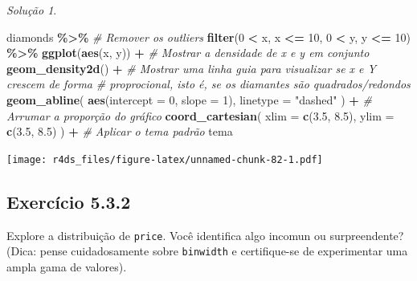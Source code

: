 \documentclass[
]{latex/krantz}
\newenvironment{Shaded}{\begin{snugshade}}{\end{snugshade}}
\newcommand{\AttributeTok}[1]{\textcolor[rgb]{0.13,0.29,0.53}{#1}}
\newcommand{\CommentTok}[1]{\textcolor[rgb]{0.56,0.35,0.01}{\textit{#1}}}
\newcommand{\DecValTok}[1]{\textcolor[rgb]{0.00,0.00,0.81}{#1}}
\newcommand{\FloatTok}[1]{\textcolor[rgb]{0.00,0.00,0.81}{#1}}
\newcommand{\FunctionTok}[1]{\textcolor[rgb]{0.13,0.29,0.53}{\textbf{#1}}}
\newcommand{\NormalTok}[1]{#1}
\newcommand{\SpecialCharTok}[1]{\textcolor[rgb]{0.81,0.36,0.00}{\textbf{#1}}}
\newcommand{\StringTok}[1]{\textcolor[rgb]{0.31,0.60,0.02}{#1}}
\theoremstyle{definition}
\theoremstyle{definition}
\theoremstyle{definition}
\theoremstyle{definition}
\theoremstyle{remark}
\newtheorem*{solution}{Solução}
\begin{document}
\begin{solution}
\begin{Shaded}
\begin{Highlighting}[]
\NormalTok{diamonds }\SpecialCharTok{\%\textgreater{}\%} 
  \CommentTok{\# Remover os outliers}
  \FunctionTok{filter}\NormalTok{(}\DecValTok{0} \SpecialCharTok{\textless{}}\NormalTok{ x, x }\SpecialCharTok{\textless{}=} \DecValTok{10}\NormalTok{, }\DecValTok{0} \SpecialCharTok{\textless{}}\NormalTok{ y, y }\SpecialCharTok{\textless{}=} \DecValTok{10}\NormalTok{) }\SpecialCharTok{\%\textgreater{}\%}
  \FunctionTok{ggplot}\NormalTok{(}\FunctionTok{aes}\NormalTok{(x, y)) }\SpecialCharTok{+}
    \CommentTok{\# Mostrar a densidade de x e y em conjunto}
    \FunctionTok{geom\_density2d}\NormalTok{() }\SpecialCharTok{+}                      
    \CommentTok{\# Mostrar uma linha guia para visualizar se x e Y crescem de forma }
    \CommentTok{\# proprocional, isto é, se os diamantes são quadrados/redondos}
    \FunctionTok{geom\_abline}\NormalTok{(}
      \FunctionTok{aes}\NormalTok{(}\AttributeTok{intercept =} \DecValTok{0}\NormalTok{, }\AttributeTok{slope =} \DecValTok{1}\NormalTok{),}
      \AttributeTok{linetype =} \StringTok{"dashed"}
\NormalTok{    ) }\SpecialCharTok{+}
    \CommentTok{\# Arrumar a proporção do gráfico}
    \FunctionTok{coord\_cartesian}\NormalTok{(}
      \AttributeTok{xlim =} \FunctionTok{c}\NormalTok{(}\FloatTok{3.5}\NormalTok{, }\FloatTok{8.5}\NormalTok{),}
      \AttributeTok{ylim =} \FunctionTok{c}\NormalTok{(}\FloatTok{3.5}\NormalTok{, }\FloatTok{8.5}\NormalTok{)}
\NormalTok{    ) }\SpecialCharTok{+}
    \CommentTok{\# Aplicar o tema padrão}
\NormalTok{    tema}
\end{Highlighting}
\end{Shaded}

\texttt{[image: r4ds\_files/figure-latex/unnamed-chunk-82-1.pdf]}
\end{solution}

\hypertarget{exr5-3-2}{%
\subsection*{Exercício 5.3.2}\label{exr5-3-2}}

Explore a distribuição de \texttt{price}. Você identifica algo incomun ou surpreendente? (Dica: pense cuidadosamente sobre \texttt{binwidth} e certifique-se de experimentar uma ampla gama de valores).
\end{document}
